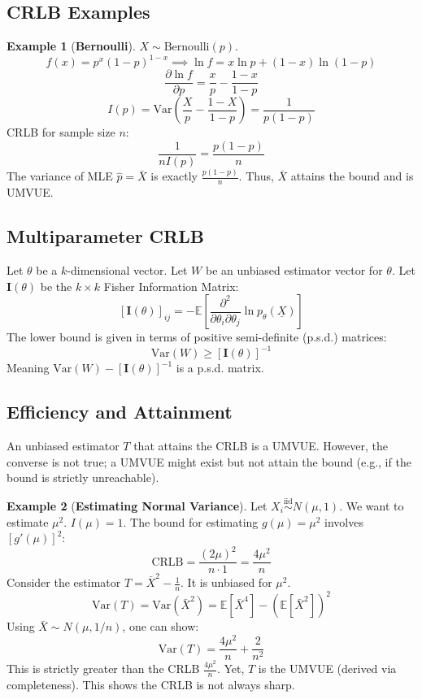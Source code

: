 \documentclass[12pt, a4paper]{article}
\theoremstyle{definition}
\newtheorem{example}{Example}
\newcommand{\E}{\mathbb{E}}
\newcommand{\Var}{\text{Var}}
\newcommand{\iid}{\overset{\text{iid}}{\sim}}
\newcommand{\Xvec}{\underline{X}}
\begin{document}
\subsection{CRLB Examples}

\begin{example}[\textbf{Bernoulli}]
$X \sim \text{Bernoulli}(p)$.
$$ f(x) = p^x (1-p)^{1-x} \implies \ln f = x \ln p + (1-x) \ln (1-p) $$
$$ \frac{\partial \ln f}{\partial p} = \frac{x}{p} - \frac{1-x}{1-p} $$
$$ I(p) = \Var\left(\frac{X}{p} - \frac{1-X}{1-p}\right) = \frac{1}{p(1-p)} $$
CRLB for sample size $n$:
$$ \frac{1}{n I(p)} = \frac{p(1-p)}{n} $$
The variance of MLE $\hat{p} = \bar{X}$ is exactly $\frac{p(1-p)}{n}$. Thus, $\bar{X}$ attains the bound and is UMVUE.
\end{example}

\subsection{Multiparameter CRLB}
Let $\theta$ be a $k$-dimensional vector. Let $W$ be an unbiased estimator vector for $\theta$.
Let $\mathbf{I}(\theta)$ be the $k \times k$ Fisher Information Matrix:
$$ [\mathbf{I}(\theta)]_{ij} = -\E\left[ \frac{\partial^2}{\partial \theta_i \partial \theta_j} \ln p_\theta(\Xvec) \right] $$
The lower bound is given in terms of positive semi-definite (p.s.d.) matrices:
$$ \Var(W) \ge [\mathbf{I}(\theta)]^{-1} $$
Meaning $\Var(W) - [\mathbf{I}(\theta)]^{-1}$ is a p.s.d. matrix.

\subsection{Efficiency and Attainment}
An unbiased estimator $T$ that attains the CRLB is a UMVUE. However, the converse is not true; a UMVUE might exist but not attain the bound (e.g., if the bound is strictly unreachable).

\begin{example}[\textbf{Estimating Normal Variance}]
Let $X_i \iid N(\mu, 1)$. We want to estimate $\mu^2$.
$I(\mu) = 1$. The bound for estimating $g(\mu)=\mu^2$ involves $[g'(\mu)]^2$:
$$ \text{CRLB} = \frac{(2\mu)^2}{n \cdot 1} = \frac{4\mu^2}{n} $$
Consider the estimator $T = \bar{X}^2 - \frac{1}{n}$. It is unbiased for $\mu^2$.
$$ \Var(T) = \Var(\bar{X}^2) = \E[\bar{X}^4] - (\E[\bar{X}^2])^2 $$
Using $\bar{X} \sim N(\mu, 1/n)$, one can show:
$$ \Var(T) = \frac{4\mu^2}{n} + \frac{2}{n^2} $$
This is strictly greater than the CRLB $\frac{4\mu^2}{n}$. Yet, $T$ is the UMVUE (derived via completeness).
This shows the CRLB is not always sharp.
\end{example}
\end{document}
